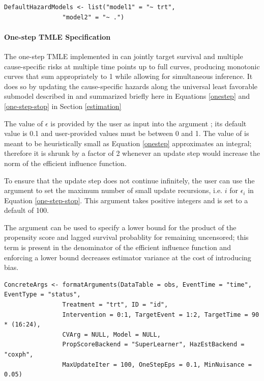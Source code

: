 \documentclass{report}
\newcommand{\1}{\ensuremath{\mathbf{1}}}
\begin{document}
\begin{lstlisting}
DefaultHazardModels <- list("model1" = "~ trt", 
			    "model2" = "~ .")
\end{lstlisting}

\paragraph{One-step TMLE Specification}
\label{tmle-specification}
The one-step TMLE implemented in  can jointly target survival and multiple cause-specific risks at multiple time points up to full curves, producing monotonic curves that sum appropriately to 1 while allowing for simultaneous inference. It does so by updating the cause-specific hazards along the universal least favorable submodel described in \cite{rytgaard_one-step_2021} and summarized briefly here in Equations \eqref{onestep} and \eqref{one-step-stop} in Section \ref{estimation}

The value of \(\epsilon\) is provided by the user as input into the argument ; its default value is 0.1 and user-provided values must be between 0 and 1. The value of  is meant to be heuristically small as Equation \eqref{onestep} approximates an integral; therefore it is shrunk by a factor of 2 whenever an update step would increase the norm of the efficient influence function.

To ensure that the update step does not continue infinitely, the user can use the argument  to set the maximum number of small update recursions, i.e. \(i\) for \(\epsilon_i\) in Equation \eqref{one-step-stop}. This argument takes positive integers and is set to a default of 100.

The argument  can be used to specify a lower bound for the product of the propensity score and lagged survival probablity for remaining uncensored; this term is present in the denominator of the efficient influence function and enforcing a lower bound decreases estimator variance at the cost of introducing bias. 

\begin{lstlisting}
ConcreteArgs <- formatArguments(DataTable = obs, EventTime = "time", EventType = "status", 
				Treatment = "trt", ID = "id", 
				Intervention = 0:1, TargetEvent = 1:2, TargetTime = 90 * (16:24), 
				CVArg = NULL, Model = NULL, 
				PropScoreBackend = "SuperLearner", HazEstBackend = "coxph", 
				MaxUpdateIter = 100, OneStepEps = 0.1, MinNuisance = 0.05)
\end{lstlisting}
\end{document}
